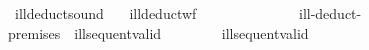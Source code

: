 \ ill{\isacharunderscore}deduct{\isacharunderscore}sound{\isacharcomma}\isanewline
\ \ \ ill{\isacharunderscore}deduct{\isacharunderscore}wf\ \isanewline
\ \ \ \ \ \ \ \ \ \ \ {\isasymforall}\ {\isasymin}\ ill-deduct-premises\ \ ill{\isacharunderscore}sequent{\isacharunderscore}valid\ \isanewline
\ \ \ \ \ \ \ ill{\isacharunderscore}sequent{\isacharunderscore}valid\ 
